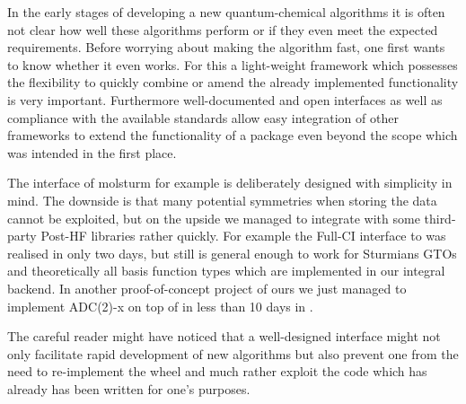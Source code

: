 In the early stages of developing a new quantum-chemical algorithms
it is often not clear how well these algorithms perform
or if they even meet the expected requirements.
Before worrying about making the algorithm fast,
one first wants to know whether it even works.
For this a light-weight framework which possesses the flexibility
to quickly combine or amend the already implemented
functionality is very important.
Furthermore well-documented and open interfaces
as well as compliance with the available standards
allow easy integration of other frameworks to extend
the functionality of a package even beyond the scope
which was intended in the first place.

The \python interface of molsturm for example is deliberately designed
with simplicity in mind.
The downside is that many potential symmetries when storing the data
cannot be exploited,
but on the upside we managed to integrate \molsturm
with some third-party Post-HF libraries rather quickly.
For example the Full-CI interface to \pyscf was realised in only two days,
but still is general enough to work for Sturmians GTOs and theoretically
all basis function types which are implemented in our integral backend.
In another proof-of-concept project of ours we just managed to
implement ADC(2)-x on top of \molsturm in less than 10 days in \python.

The careful reader might have noticed that a well-designed interface
might not only facilitate rapid development of new algorithms
but also prevent one from the need to re-implement the wheel
and much rather exploit the code which has already has been written
for one's purposes.

%


%



